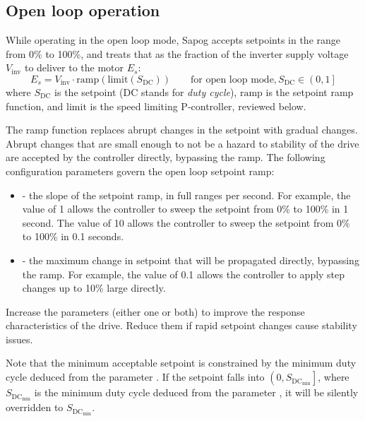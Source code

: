 \documentclass{zubaxdoc}
\begin{document}
\subsection{Open loop operation}\label{sec:open_loop}

While operating in the open loop mode, Sapog accepts setpoints in the range from 0\% to 100\%,
and treats that as the fraction of the inverter supply voltage $V_\text{inv}$ to
deliver to the motor $E_s$:
\begin{equation}
E_s = V_\text{inv}\cdot{}\mathrm{ramp}\left(\mathrm{limit}\left(S_\text{DC}\right)\right)
\qquad\text{for open loop mode}, S_\text{DC} \in \left(0, 1\right]
\end{equation}
where $S_\text{DC}$ is the setpoint (DC stands for \emph{duty cycle}),
$\mathrm{ramp}$ is the setpoint ramp function,
and $\mathrm{limit}$ is the speed limiting P-controller, reviewed below.

The ramp function replaces abrupt changes in the setpoint with gradual changes.
Abrupt changes that are small enough to not be a hazard to stability of the drive are
accepted by the controller directly, bypassing the ramp.
The following configuration parameters govern the open loop setpoint ramp:

\begin{itemize}
\item {} - the slope of the setpoint ramp, in full ranges per second.
For example, the value of 1 allows the controller to sweep the setpoint from 0\% to 100\% in 1 second.
The value of 10 allows the controller to sweep the setpoint from 0\% to 100\% in 0.1 seconds.
\item {} - the maximum change in setpoint that will be propagated directly,
bypassing the ramp.
For example, the value of 0.1 allows the controller to apply step changes up to 10\% large directly.
\end{itemize}

Increase the parameters (either one or both) to improve the response characteristics of the drive.
Reduce them if rapid setpoint changes cause stability issues.

Note that the minimum acceptable setpoint is constrained by the minimum duty cycle deduced from
the parameter .
If the setpoint falls into $\left(0, S_{\text{DC}_\text{min}}\right]$,
where $S_{\text{DC}_\text{min}}$ is the minimum
duty cycle deduced from the parameter ,
it will be silently overridden to $S_{\text{DC}_\text{min}}$.
\end{document}
